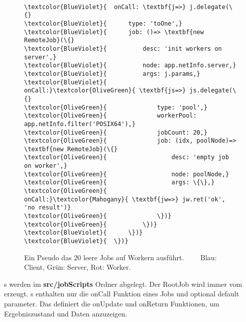 \begin{wrapfigure}{r}[10mm]{0.73\textwidth}
  \vspace{-10mm}

  \begin{center}
    \hspace{-5cm}
    \begin{Verbatim}

\textcolor{BlueViolet}{  onCall: \textbf{j=>} j.delegate(\{}
\textcolor{BlueViolet}{      type: 'toOne',}
\textcolor{BlueViolet}{      job: ()=> \textbf{new RemoteJob}(\{}
\textcolor{BlueViolet}{          desc: 'init workers on server',}
\textcolor{BlueViolet}{          node: app.netInfo.server,}
\textcolor{BlueViolet}{          args: j.params,}
\textcolor{BlueViolet}{          onCall:}\textcolor{OliveGreen}{ \textbf{js=>} js.delegate(\{}
\textcolor{OliveGreen}{              type: 'pool',}
\textcolor{OliveGreen}{              workerPool: app.netInfo.filter('POSIX64'),}
\textcolor{OliveGreen}{              jobCount: 20,}
\textcolor{OliveGreen}{              job: (idx, poolNode)=> \textbf{new RemoteJob}(\{}
\textcolor{OliveGreen}{                  desc: 'empty job on worker',}
\textcolor{OliveGreen}{                  node: poolNode,}
\textcolor{OliveGreen}{                  args: \{\},}
\textcolor{OliveGreen}{                  onCall:}\textcolor{Mahogany}{ \textbf{jw=>} jw.ret('ok', 'no result')}
\textcolor{OliveGreen}{              \})}
\textcolor{OliveGreen}{          \})}
\textcolor{BlueViolet}{      \})}
\textcolor{BlueViolet}{  \})}

    \end{Verbatim}
  \end{center}
  \caption{Ein Pseudo \jobScript{} das 20 leere Jobs auf Workern ausführt. \textcolor{White}{- - -} \protect\linebreak Blau: Client, Grün: Server, Rot: Worker.}
  \label{code}
\end{wrapfigure}

\noindent \jobScript s werden im \textbf{src/jobScripts} Ordner abgelegt.
Der RootJob wird immer vom \UI{} erzeugt.
\jobScript s enthalten nur die onCall Funktion eines Jobs und optional default parameter.
Das \UI{} definiert die onUpdate und onReturn Funktionen, um Ergebniszustand und Daten anzuzeigen.


